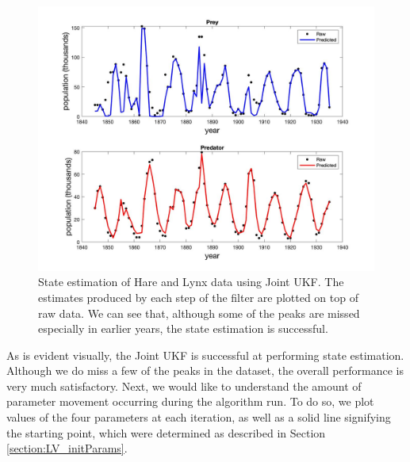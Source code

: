 \begin{figure}[H]
    \centering
    \includegraphics[width=15cm]{Kalman_Filter_Images/LV_Joint_StateEstimation.jpg}
    \caption{State estimation of Hare and Lynx data using Joint UKF. The estimates produced by each step of the filter are plotted on top of raw data. We can see that, although some of the peaks are missed especially in earlier years, the state estimation is successful.}
    \label{fig:LV_Joint_StateEstimation}
\end{figure}

As is evident visually, the Joint UKF is successful at performing state estimation. Although we do miss a few of the peaks in the dataset, the overall performance is very much satisfactory. Next, we would like to understand the amount of parameter movement occurring during the algorithm run. To do so, we plot values of the four parameters at each iteration, as well as a solid line signifying the starting point, which were determined as described in Section \ref{section:LV_initParams}.

